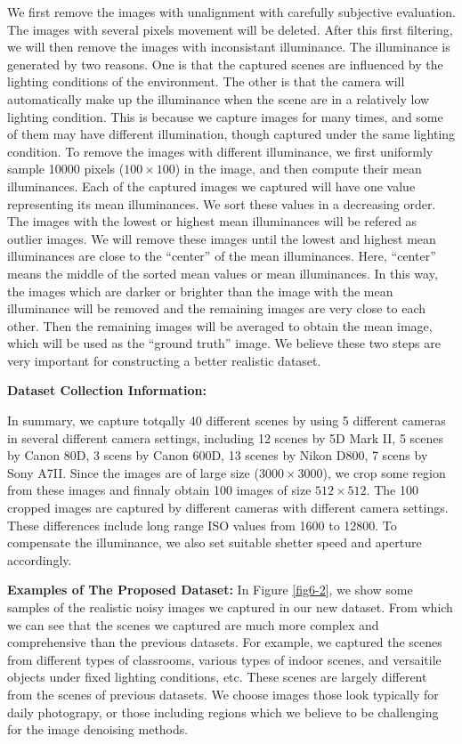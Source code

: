 We first remove the images with unalignment with carefully subjective evaluation. The images with several pixels movement will be deleted. After this first filtering, we will then remove the images with inconsistant illuminance. The illuminance is generated by two reasons. One is that the captured scenes are influenced by the lighting conditions of the environment. The other is that the camera will automatically make up the illuminance when the scene are in a relatively low lighting condition. This is because we capture images for many times, and some of them may have different illumination, though captured under the same lighting condition. To remove the images with different illuminance, we first uniformly sample 10000 pixels ($100\times100$) in the image, and then compute their mean illuminances. Each of the captured images we captured will have one value representing its mean illuminances. We sort these values in a decreasing order. The images with the lowest or highest mean illuminances will be refered as outlier images. We will remove these images until the lowest and highest mean illuminances are close to the ``center'' of the mean illuminances. Here, ``center'' means the middle of the sorted mean values or mean illuminances. In this way, the images which are darker or brighter than the image with the mean illuminance will be removed and the remaining images are very close to each other. Then the remaining images will be averaged to obtain the mean image, which will be used as the ``ground truth'' image. We believe these two steps are very important for constructing a better realistic dataset.


\textbf{Dataset Collection Information:} 

In summary, we capture totqally 40 different scenes by using 5 different cameras in several different camera settings, including 12 scenes by 5D Mark II, 5 scenes by Canon 80D, 3 scens by Canon 600D, 13 scenes by Nikon D800, 7 scens by Sony A7II. Since the images are of large size ($3000\times3000$), we crop some region from these images and finnaly obtain 100 images of size $512\times512$. The 100 cropped images are captured by different cameras with different camera settings. These differences include long range ISO values from 1600 to 12800. To compensate the illuminance, we also set suitable shetter speed and aperture accordingly. 

\textbf{Examples of The Proposed Dataset:} In Figure \ref{fig6-2}, we show some samples of the realistic noisy images we captured in our new dataset. From which we can see that the scenes we captured are much more complex and comprehensive than the previous datasets. For example, we captured the scenes from different types of classrooms, various types of indoor scenes, and versaitile objects under fixed lighting conditions, etc. These scenes are largely different from the scenes of previous datasets. We choose images those look typically for daily photograpy, or those including regions which we believe to be challenging for the image denoising methods. 

